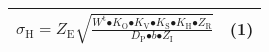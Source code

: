 \subsubsection{}\begin{tabular}{|p{3.1in}|p{1.2in}|} \hline 
${\sigma }_{\mathrm{H}}\mathrm{=}Z_{\mathrm{E}}\sqrt{\frac{W^{\mathrm{t}}{\mathrm{\bullet }K}_{\mathrm{O}}{\mathrm{\bullet }K}_{\mathrm{V}}\mathrm{\bullet }K_{\mathrm{S}}\mathrm{\bullet }K_{\mathrm{H}}\mathrm{\bullet }Z_{\mathrm{R}}}{D_{\mathrm{P}}\mathrm{\bullet }b\mathrm{\bullet }Z_{\mathrm{I}}}}$ & (1) \\ \hline 
\end{tabular}
